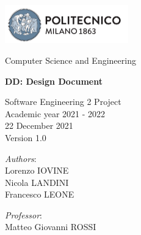 





{\begin{titlepage}
    \begin{center}
		\includegraphics[width=0.4\textwidth]{Images/PolimiLogo.png}
		
		\vspace{0.2cm}
		
		\Large Computer Science and Engineering
		
		\vspace{0.8cm}
	
		\Huge \textbf{DD: Design Document}

		
		\vspace{1.5cm}
		\LARGE Software Engineering 2 Project\\
		\Large Academic year 2021 - 2022\\
		\vspace{1cm}
		22 December 2021\\Version 1.0
		\vspace{3cm}
		
		\large
		\begin{minipage}{.1\textwidth}
			\null
		\end{minipage}%
		\begin{minipage}{.4\textwidth}
			\textit{Authors}:\\
			Lorenzo IOVINE\\
			Nicola LANDINI\\
            Francesco LEONE
		\end{minipage}%
		\begin{minipage}{.4\textwidth}
			\raggedleft	
			\textit{Professor}:\\
			Matteo Giovanni ROSSI\\
			\phantom{placeholder}
		\end{minipage}%
		\begin{minipage}{.1\textwidth}
			\null
		\end{minipage}
	
			
		\end{center}
\end{titlepage}}~\\ 


